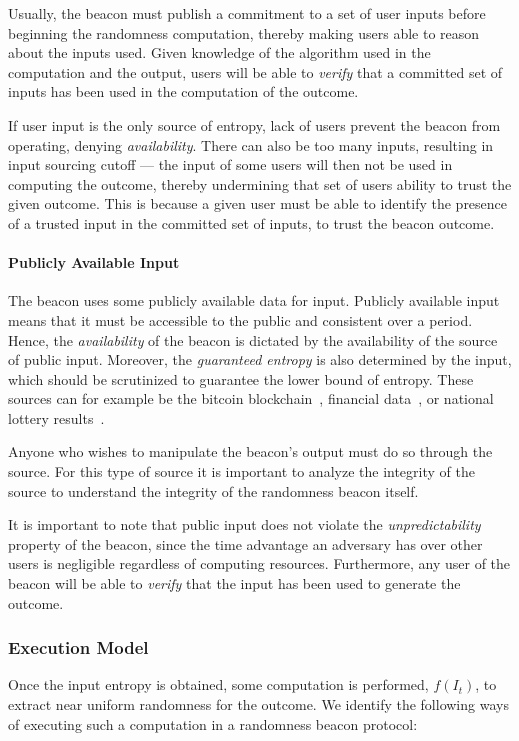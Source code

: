         Usually, the beacon must publish a commitment to a set of user inputs before beginning the randomness computation,  thereby making users able to reason about the inputs used.
        Given knowledge of the algorithm used in the computation and the output, users will be able to \emph{verify} that a committed set of inputs has been used in the computation of the outcome.

        If user input is the only source of entropy, lack of users prevent the beacon from operating, denying \emph{availability}.
        There can also be too many inputs, resulting in input sourcing cutoff ---
        the input of some users will then not be used in computing the outcome, thereby undermining that set of users ability to trust the given outcome.
        This is because a given user must be able to identify the presence of a trusted input in the committed set of inputs, to trust the beacon outcome.

\paragraph{Publicly Available Input}
        The beacon uses some publicly available data for input.
        Publicly available input means that it must be accessible to the public and consistent over a period.
        Hence, the \emph{availability} of the beacon is dictated by the availability of the source of public input.
        Moreover, the \emph{guaranteed entropy} is also determined by the input, which should be scrutinized to guarantee the lower bound of entropy.
        These sources can for example be the bitcoin blockchain~\cite{bonneau2015bitcoin, bentov2016bitcoin}, financial data~\cite{clark2010use}, or national lottery results~\cite{baigneres2015trap}.

        Anyone who wishes to manipulate the beacon's output must do so through the source.
        For this type of source it is important to analyze the integrity of the source to understand the integrity of the randomness beacon itself.

        It is important to note that public input does not violate the \emph{unpredictability} property of the beacon, since the time advantage an adversary has over other users is negligible regardless of computing resources.
        Furthermore, any user of the beacon will be able to \emph{verify} that the input has been used to generate the outcome.

\subsubsection{Execution Model}
Once the input entropy is obtained, some computation is performed, $f(I_t)$, to extract near uniform randomness for the outcome.
We identify the following ways of executing such a computation in a randomness beacon protocol:

